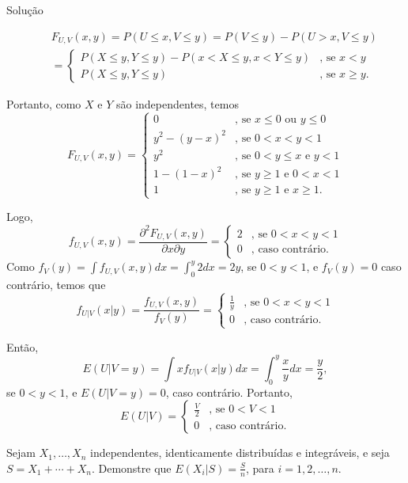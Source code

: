 \begin{frame}
\begin{block}{Solução}


\begin{eqnarray}
& & F_{U,V}(x,y)=P(U\leq x,V\leq y)=P(V\leq y)-P(U>x,V\leq y) \nonumber \\
& & =\left \{\begin{array}{cc}
P(X\leq y,Y\leq y)-P(x<X\leq y,x<Y\leq y) & \mbox{, se $x<y$} \\
P(X\leq y,Y\leq y) & \mbox{, se $x\geq y$.}
\end{array}
\right. \nonumber
\end{eqnarray}

Portanto, como $X$ e $Y$ são independentes, temos
$$F_{U,V}(x,y)=\left \{\begin{array}{cc}
0 & \mbox{, se $x\leq 0$ ou $y\leq 0$}\\
y^2-(y-x)^2 & \mbox{, se $0<x<y<1$} \\
y^2 & \mbox{, se $0<y\leq x$ e $y<1$}\\
1-(1-x)^2 & \mbox{, se $y\geq 1$ e $0<x<1$}\\
1 & \mbox{, se $y\geq 1$ e $x\geq 1$.}
\end{array}
\right.$$

Logo,
$$f_{U,V}(x,y)=\frac{\partial^2 F_{U,V}(x,y)}{\partial x\partial y}=\left \{\begin{array}{cc}
2 & \mbox{, se $0<x<y<1$} \\
0 & \mbox{, caso contrário.}
\end{array}
\right.$$
Como $f_V(y)=\int f_{U,V}(x,y)dx=\int_{0}^{y}2dx=2y$, se $0<y<1$, e $f_V(y)=0$ caso contrário, temos que
$$f_{U|V}(x|y)=\frac{f_{U,V}(x,y)}{f_{V}(y)}=\left \{\begin{array}{cc}
\frac{1}{y} & \mbox{, se $0<x<y<1$} \\
0 & \mbox{, caso contrário.}
\end{array}
\right.$$

\end{block}
\end{frame}

\begin{frame}
\begin{block}{}


Então,
$$E(U|V=y)=\int xf_{U|V}(x|y)dx=\int_{0}^{y}\frac{x}{y}dx=\frac{y}{2},$$
se $0<y<1$, e $E(U|V=y)=0$, caso contrário.
Portanto, $$E(U|V)=\left \{\begin{array}{cc}
\frac{V}{2} & \mbox{, se $0<V<1$} \\
0 & \mbox{, caso contrário.}
\end{array}
\right.$$
\end{block}

\begin{exem}
Sejam $X_1,\ldots,X_n$ independentes, identicamente distribuídas e integráveis, e seja $S=X_1+\cdots+X_n$. Demonstre que $E(X_i|S)=\frac{S}{n}$, para $i=1,2,\ldots,n$.
\end{exem}

\end{frame}

